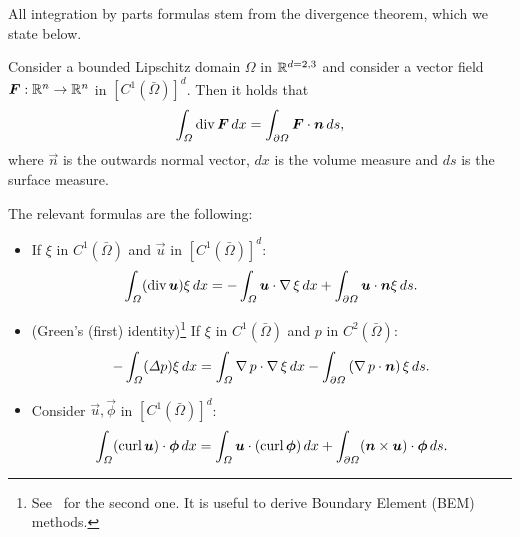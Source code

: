 All integration by parts formulas stem from the divergence theorem, which we state below.
\begin{theorem}\label{thm:divergence}
    Consider a bounded Lipschitz domain $\Omega$ in $\mathbb{R}^{d=2,3}$ and consider a vector field $\vec F:\R^n \to \R^n$ in $[C^1(\bar\Omega)]^d$. Then it holds that
    \begin{equation*}
        \int_\Omega \dive \vec F\,dx = \int_{\partial\Omega}\vec F\cdot \vec n\,ds,
    \end{equation*}
    where $\vec n$ is the outwards normal vector, $dx$ is the volume measure and $ds$ is the surface measure.
\end{theorem}
The relevant formulas are the following: 
\begin{itemize}
    \item If $\xi$ in $C^1(\bar\Omega)$ and $\vec u$ in $[C^1(\bar\Omega)]^d$:
    \begin{equation}
        \int_\Omega (\dive \vec u) \xi\,dx = -\int_\Omega\vec u\cdot \grad \xi\,dx + \int_{\partial\Omega} \vec u \cdot \vec n \xi\,ds.
    \end{equation}
    \item (Green's (first) identity)\footnote{See~\cite{monk2003finite} for the second one. It is useful to derive Boundary Element (BEM) methods.} If $\xi$ in $C^1(\bar\Omega)$ and $p$ in $C^2(\bar\Omega)$:
    \begin{equation}
        -\int_\Omega (\Delta p) \xi\,dx = \int_\Omega\grad p\cdot \grad \xi\,dx - \int_{\partial\Omega}\left(\grad p\cdot \vec n\right)\xi\,ds.
    \end{equation}
    \item Consider $\vec u,\vec \phi$ in $[C^1(\bar\Omega)]^d$: 
    \begin{equation}
        \int_\Omega (\curl \vec u) \cdot \vec\phi\,dx = \int_\Omega \vec u \cdot (\curl \vec \phi)\,dx  + \int_{\partial\Omega}(\vec n\times \vec u)\cdot \vec\phi\,ds.
    \end{equation}
\end{itemize}

